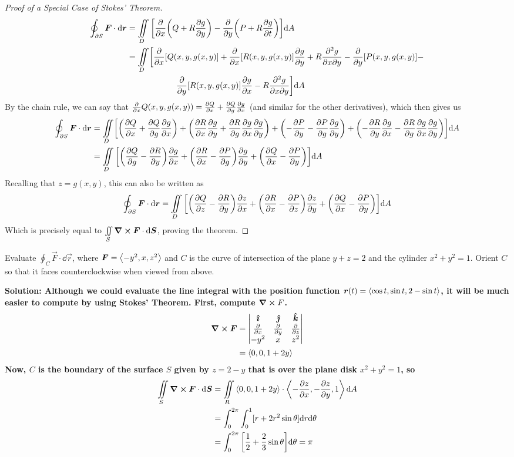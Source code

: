 \begin{proof}[Proof of a Special Case of Stokes' Theorem]
    \begin{align*}
        \oint_{\partial S}\vec F \cdot \dd \vec r
        &= \iint\limits_D \bqty{\pdv{x}\pqty{Q+R\pdv{g}{y}}-\pdv{y}\pqty{P+R\pdv{g}{t}}}\dd A \\
        &= \iint\limits_D \biggr[\pdv{x}[Q(x,y,g(x,y)] + \pdv{x}[R(x,y,g(x,y)]\pdv{g}{y} + R\pdvv{g}{x}{y} - \pdv{y}[P(x,y,g(x,y)] - \\&\qquad\qquad\qquad\pdv{y}[R(x,y,g(x,y)]\pdv{g}{x}-R\pdvv{g}{x}{y}\biggr]\dd A
    \end{align*}
    By the chain rule, we can say that $\pdv{x}Q(x,y,g(x,y)) = \pdv{Q}{x} + \pdv{Q}{g}\pdv{g}{x}$ (and similar for the other derivatives), which then gives us
    \begin{align*}
        \oint_{\partial S}\vec F \cdot \dd \vec r &= \iint\limits_D \biggr[\pqty{\pdv{Q}{x}+\pdv{Q}{g}\pdv{g}{x}} + \pqty{\pdv{R}{x}\pdv{g}{y} +\pdv{R}{g}\pdv{g}{x}\pdv{g}{y}} + \pqty{-\pdv{P}{y} - \pdv{P}{g}\pdv{g}{y}} + \pqty{ - \pdv{R}{y}\pdv{g}{x} - \pdv{R}{g}\pdv{g}{x}\pdv{g}{y}}\biggr]\dd A \\
        &= \iint\limits_D \bqty{\pqty{\pdv{Q}{g}-\pdv{R}{y}}\pdv{g}{x}+\pqty{\pdv{R}{x}-\pdv{P}{g}}\pdv{g}{y}+\pqty{\pdv{Q}{x}-\pdv{P}{y}}}\dd A
    \end{align*}
    Recalling that $z=g(x,y)$, this can also be written as
    \[ \oint_{\partial S} \vec F \cdot \dd \vec r = \iint\limits_D \bqty{\pqty{\pdv{Q}{z}-\pdv{R}{y}}\pdv{z}{x}+\pqty{\pdv{R}{x}-\pdv{P}{z}}\pdv{z}{y}+\pqty{\pdv{Q}{x}-\pdv{P}{y}}}\dd A \]
    Which is precisely equal to $\iint\limits_S \curl \boldsymbol{F} \cdot \dd \boldsymbol{S}$, proving the theorem.
\end{proof}
\begin{example}
    Evaluate $\oint_C \vec F \cdot \dd \vec r$, where $\boldsymbol{F} = \left\langle-y^2, x, z^2\right\rangle$ and $C$ is the curve of intersection of the plane $y+z=2$ and the cylinder $x^2+y^2=1$. Orient $C$ so that it faces counterclockwise when viewed from above. \par
    \bf{Solution:} Although we could evaluate the line integral with the position function $\boldsymbol{r}(t) = \left\langle\cos t, \sin t, 2-\sin t\right\rangle$, it will be much easier to compute by using Stokes' Theorem. First, compute $\curl F$.
    \begin{align*}
        \curl \boldsymbol{F} &= \begin{vmatrix} \boldsymbol{\hat{\imath}} & \boldsymbol{\hat{\jmath}} & \boldsymbol{\hat{k}} \\ \pdv{x} & \pdv{y} & \pdv{z} \\ -y^2 & x & z^2\end{vmatrix} \\
        &= \left\langle0, 0, 1+2y\right\rangle
    \end{align*}
    Now, $C$ is the boundary of the surface $S$ given by $z=2-y$ that is over the plane disk $x^2+y^2=1$, so 
    \begin{align*}
        \iint\limits_S \curl \vec F \cdot \dd \vec S &= \iint\limits_R \<0, 0, 1+2y\> \cdot \<-\pdv{z}{x}, -\pdv{z}{y}, 1\> \dd A \\
        &= \int_0^{2\pi}\int_0^1 [r+2r^2\sin\theta]\dd r\dd \theta \\
        &= \int_0^{2\pi} \bqty{\frac{1}{2}+\frac{2}{3}\sin\theta}\dd \theta = \pi
    \end{align*}
\end{example}
